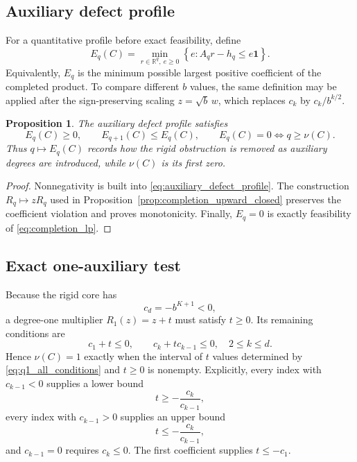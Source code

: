 \documentclass[11pt]{amsart}
\numberwithin{equation}{section}
\theoremstyle{plain}
\newtheorem{proposition}[theorem]{Proposition}
\theoremstyle{definition}
\theoremstyle{remark}
\begin{document}
\subsection{Auxiliary defect profile}
\label{subsec:auxiliary_defect_profile}

For a quantitative profile before exact feasibility, define
\begin{equation}
E_q(C)
=
\min_{r\in\mathbb R^q,\ e\geq0}
\left\{
e:
A_qr-h_q\leq e\mathbf 1
\right\}.
\label{eq:auxiliary_defect_profile}
\end{equation}
Equivalently, $E_q$ is the minimum possible largest positive coefficient of the completed product.  To compare different $b$ values, the same definition may be applied after the sign-preserving scaling $z=\sqrt b\,w$, which replaces $c_k$ by $c_k/b^{k/2}$.

\begin{proposition}
\label{prop:defect_profile_properties}
The auxiliary defect profile satisfies
\begin{equation}
E_q(C)\geq0,
\qquad
E_{q+1}(C)\leq E_q(C),
\qquad
E_q(C)=0\Longleftrightarrow q\geq\nu(C).
\label{eq:defect_profile_properties}
\end{equation}
Thus $q\mapsto E_q(C)$ records how the rigid obstruction is removed as auxiliary degrees are introduced, while $\nu(C)$ is its first zero.
\end{proposition}

\begin{proof}
Nonnegativity is built into \eqref{eq:auxiliary_defect_profile}.  The construction $R_q\mapsto zR_q$ used in Proposition~\ref{prop:completion_upward_closed} preserves the coefficient violation and proves monotonicity.  Finally, $E_q=0$ is exactly feasibility of \eqref{eq:completion_lp}.
\end{proof}

\subsection{Exact one-auxiliary test}
\label{subsec:one_auxiliary_test}

Because the rigid core has
\begin{equation}
c_d=-b^{K+1}<0,
\label{eq:core_constant_negative}
\end{equation}
a degree-one multiplier $R_1(z)=z+t$ must satisfy $t\geq0$.  Its remaining conditions are
\begin{equation}
c_1+t\leq0,
\qquad
c_k+t c_{k-1}\leq0,
\quad 2\leq k\leq d.
\label{eq:q1_all_conditions}
\end{equation}
Hence $\nu(C)=1$ exactly when the interval of $t$ values determined by \eqref{eq:q1_all_conditions} and $t\geq0$ is nonempty.  Explicitly, every index with $c_{k-1}<0$ supplies a lower bound
\begin{equation}
t\geq -\frac{c_k}{c_{k-1}},
\label{eq:q1_lower_bound}
\end{equation}
every index with $c_{k-1}>0$ supplies an upper bound
\begin{equation}
t\leq -\frac{c_k}{c_{k-1}},
\label{eq:q1_upper_bound}
\end{equation}
and $c_{k-1}=0$ requires $c_k\leq0$.  The first coefficient supplies $t\leq-c_1$.
\end{document}

